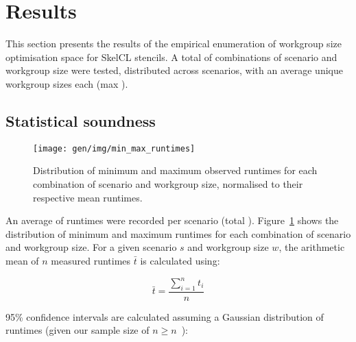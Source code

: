 
\section{Results}

This section presents the results of the empirical enumeration of
workgroup size optimisation space for SkelCL stencils. A total of
 combinations of scenario and workgroup
size were tested, distributed across 
scenarios, with an average  unique workgroup
sizes each (max ).

\subsection{Statistical soundness}

\begin{figure}
\centering
\texttt{[image: gen/img/min\_max\_runtimes]}
\caption{%
  Distribution of minimum and maximum observed runtimes for each
  combination of scenario and workgroup size, normalised to their
  respective mean runtimes. %
}
\label{fig:min-max-runtimes}
\end{figure}

An average of  runtimes were recorded per
scenario (total
). Figure~\ref{fig:min-max-runtimes} shows the
distribution of minimum and maximum runtimes for each combination of
scenario and workgroup size. For a given scenario $s$ and workgroup
size $w$, the arithmetic mean of $n$ measured runtimes $\bar{t}$ is
calculated using:

\begin{equation}
\bar{t} = \frac{\sum_{i=1}^{n}t_i}{n}
\end{equation}

95\% confidence intervals are calculated assuming a Gaussian
distribution of runtimes (given our sample size of
$n \ge n$~\cite{Georges2007}):

